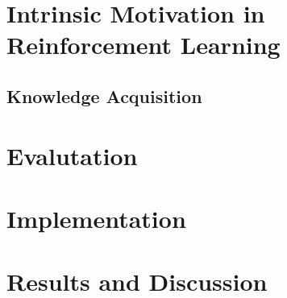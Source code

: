 \documentclass[draft,final]{vutinfth} %
\begin{document}
    \chapter{Intrinsic Motivation in Reinforcement Learning}


    \section{Knowledge Acquisition}


    \chapter{Evalutation}



    \chapter{Implementation}


    \chapter{Results and Discussion}

    \backmatter
    \listoffigures %

    \cleardoublepage %
    \listoftables %

    \listofalgorithms

    \printindex

    \printglossaries

    
    
\end{document}
